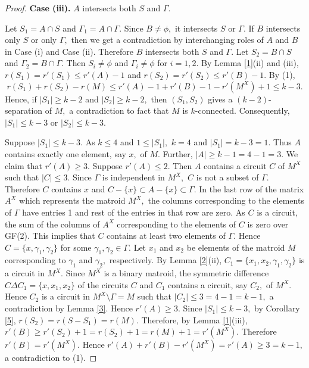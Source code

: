 \documentclass[
11pt,%
tightenlines,%
twoside,%
onecolumn,%
nofloats,%
nobibnotes,%
nofootinbib,%
superscriptaddress,%
noshowpacs,%
centertags]%
{revtex4}
\begin{document}
\begin{proof}
{\bf Case (iii).} $A$ intersects both $S$ and $ \Gamma.$

 Let $ S_1 = A\cap S$ and $\Gamma_{1} = A \cap \Gamma.$ Since $B \neq \phi,$ it  intersects $S$ or
 $\Gamma.$    If  $ B $ intersects only $S$ or only $\Gamma,$ then we get a contradiction by interchanging
 roles of $A$ and $B$ in  Case (i) and Case (ii). Therefore  $B$ intersects both $S$ and $\Gamma.$
  Let $ S_2 = B\cap S $ and   $ \Gamma_{2}= B\cap \Gamma.$  Then $ S_i \neq \phi$ and
  $ \Gamma_i \neq \phi$ for $ i =1, 2.$   By  Lemma \ref{1}(ii) and (iii),
  $r(S_1) = r'(S_1)  \leq r'(A) - 1 $ and $r(S_2) = r'(S_2)   \leq r'(B) - 1 .$ By (1),
$$
r(S_{1})+r(S_{2})-r(M) \leq r'(A)-1+r'(B)-1-r'(M^{X})+1\leq k-3.
$$
Hence, if $|S_{1}|\geq k-2$ and $|S_{2}|\geq k-2,$  then
$(S_{1},S_{2})$ gives a  $(k-2)$-separation of $M,$ a contradiction
to fact that $M$ is $k$-connected. Consequently, $|S_{1}|\leq k-3$
or $|S_{2}|\leq k-3.$

Suppose  $|S_1| \leq  k-3.$  As $ k \leq 4$ and $1\leq |S_1|,$ $k=4$
and $|S_1 | = k-3 = 1.$ Thus $A$ contains exactly one element, say
$x,$  of $M.$  Further, $|A| \geq k -1 = 4-1 =3.$  We claim that
$r'(A)\geq 3.$ Suppose $r'(A)\leq 2.$ Then $A$ contains a circuit
$C$ of $M^X$ such that $|C| \leq 3.$ Since $\Gamma$ is independent
in $M^X,$ $ C$ is not a subset of $\Gamma.$ Therefore $C$ contains
$x$ and $ C - \{x\} \subset A -\{x \} \subset \Gamma.$   In the last
row of the matrix $A^X$ which represents the matroid $M^X,$  the
columns corresponding to the elements of $\Gamma$ have entries 1 and
rest of the entries in that row are zero. As $C$ is a circuit, the
sum of the columns of $A^X$ corresponding to the elements of $C$ is
zero over GF(2). This implies that $C$ contains at least two
elements of $\Gamma.$ Hence $ C =\{x, \gamma_1, \gamma_2 \}$ for
some $\gamma_1, \gamma_2\in \Gamma.$ Let $x_1$ and $x_2$ be elements
of the matroid $M$ corresponding to $\gamma_1$ and $\gamma_2,$
respectively. By Lemma \ref{2}(ii), $C_1 = \{x_1, x_2, \gamma_1,
\gamma_2\}$ is a circuit in $M^X.$ Since $M^X$ is a binary matroid,
the symmetric difference $ C \Delta C_1 =\{x, x_1, x_2 \}$ of the
circuits $C$ and $C_1$ contains a circuit, say $C_2,$  of $M^X.$
Hence $C_2$ is a circuit in $M^X \setminus \Gamma = M$  such that
$|C_2| \leq 3 = 4-1 = k-1,$  a contradiction by Lemma \ref{3}. Hence
$r'(A)\geq  3.$ Since $|S_{1}|\leq k-3,$  by Corollary \ref{5}, $
r(S_2 ) = r(S - S_1) = r(M).$ Therefore, by Lemma \ref{1}(iii),
$r'(B)\geq r'(S_2) + 1 = r(S_2) + 1 = r(M)+1 = r'(M^X).$  Therefore
$ r'(B) = r'(M^X).$  Hence  $  r'(A)+r'(B)-r'(M^{X}) = r'(A) \geq 3=
k-1,$  a contradiction to (1).


\end{proof}
\end{document}
